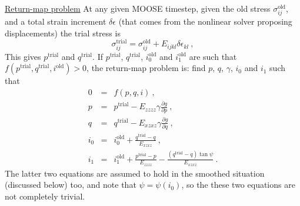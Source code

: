 \documentclass[]{scrreprt}
\begin{document}
\underline{Return-map problem} At any given MOOSE timestep, given the
old stress $\sigma_{ij}^{\mathrm{old}}$, and a total strain increment
$\delta \epsilon$ (that comes from the nonlinear solver proposing
displacements) the trial stress is
\begin{equation}
\sigma_{ij}^{\mathrm{trial}} = \sigma_{ij}^{\mathrm{old}} +
E_{ijkl}\delta\epsilon_{kl} \ ,
\end{equation}
This gives $p^{\mathrm{trial}}$ and $q^{\mathrm{trial}}$.  If
$p^{\mathrm{trial}}$, $q^{\mathrm{trial}}$, $i_{0}^{\mathrm{old}}$ and
$i_{1}^{\mathrm{old}}$ are such that $f(p^{\mathrm{trial}}, q^{\mathrm{trial}},
i^{\mathrm{old}}) > 0$, the return-map problem is: find $p$, $q$,
$\gamma$, $i_{0}$ and $i_{1}$ such that
\begin{eqnarray}
0 & = & f(p, q, i) \ , \nonumber \\
p & = & p^{\mathrm{trial}} - E_{zzzz}\gamma \frac{\partial g}{\partial
  p} \ , \nonumber \\
q & = & q^{\mathrm{trial}} - E_{xzxz}\gamma \frac{\partial g}{\partial
  q} \ , \nonumber \\
i_{0} & = & i_{0}^{\mathrm{old}} + \frac{q^{\mathrm{trial}} -
  q}{E_{xzxz}} \ , \nonumber \\
i_{1} & = & i_{1}^{\mathrm{old}} + \frac{p^{\mathrm{trial}} -
  p}{E_{zzzz}} - \frac{(q^{\mathrm{trial}} - q)\tan\psi}{E_{xzxz}} \ .
\label{rmp.eqn}
\end{eqnarray}
The latter two equations are assumed to hold in the smoothed situation
(discussed below) too, and note that $\psi = \psi(i_{0})$, so the
these two equations are not completely trivial.
\end{document}
